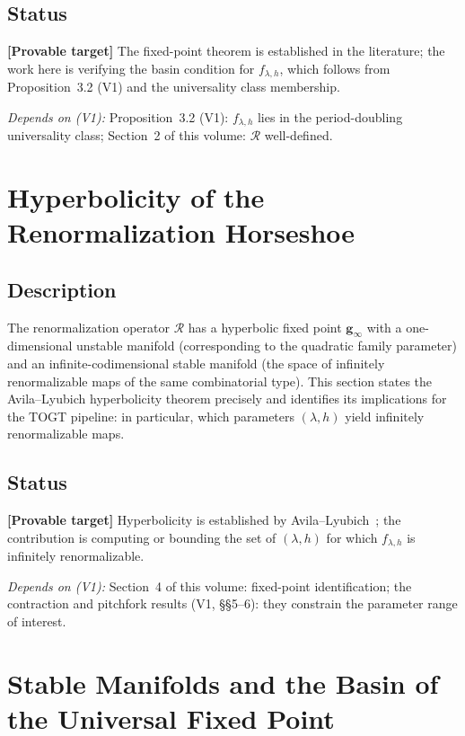 \documentclass[11pt]{article}
\newcommand{\provable}{\textcolor{blue!70!black}{\textbf{[Provable target]}}}
\newcommand{\depends}[1]{\smallskip\noindent\textit{Depends on (V1):} #1.\smallskip}
\newcommand{\g}{\boldsymbol{g}}
\begin{document}
\subsection*{Status}
\provable{} The fixed-point theorem is established in the literature;
the work here is verifying the basin condition for $f_{\lambda,h}$, which
follows from Proposition~3.2 (V1) and the universality class membership.

\depends{Proposition~3.2 (V1): $f_{\lambda,h}$ lies in the
period-doubling universality class;
Section~2 of this volume: $\mathcal{R}$ well-defined}

\section{Hyperbolicity of the Renormalization Horseshoe}

\subsection*{Description}
The renormalization operator $\mathcal{R}$ has a hyperbolic fixed point
$\g_\infty$ with a one-dimensional unstable manifold (corresponding to
the quadratic family parameter) and an infinite-codimensional stable
manifold (the space of infinitely renormalizable maps of the same
combinatorial type). This section states the Avila--Lyubich hyperbolicity
theorem precisely and identifies its implications for the TOGT pipeline:
in particular, which parameters $(\lambda, h)$ yield infinitely
renormalizable maps.

\subsection*{Status}
\provable{} Hyperbolicity is established by Avila--Lyubich~\cite{avila2011};
the contribution is computing or bounding the set of $(\lambda, h)$
for which $f_{\lambda,h}$ is infinitely renormalizable.

\depends{Section~4 of this volume: fixed-point identification;
the contraction and pitchfork results (V1, \S\S5--6): they constrain
the parameter range of interest}

\section{Stable Manifolds and the Basin of the Universal Fixed Point}
\end{document}
